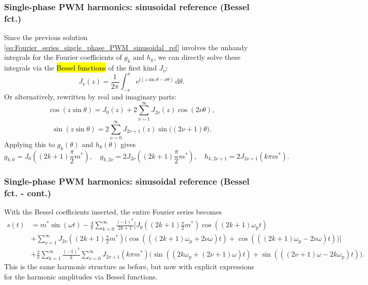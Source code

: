 \begin{frame}
    \frametitle{Single-phase PWM harmonics: sinusoidal reference (Bessel fct.)}
    Since the previous solution \eqref{eq:Fourier_series_single_phase_PWM_sinusoidal_ref} involves the unhandy integrals for the Fourier coefficients of $g_k$ and $h_k$, we can directly solve these integrals via the \hl{Bessel functions} of the first kind $J_\nu$:
    \begin{equation}
        J_\nu(z)=\frac{1}{2\pi}\int_{-\pi}^{\pi}e^{\mathrm{j}(z\sin\theta-\nu\theta)}\,\mathrm{d}\theta.
    \end{equation}
    Or alternatively, rewritten by real and imaginary parts:
    \[
        \cos(z\sin\theta)=J_0(z)+2\sum_{\nu=1}^{\infty}J_{2\nu}(z)\cos(2\nu\theta),
    \]
    \[
        \sin(z\sin\theta)=2\sum_{\nu=0}^{\infty}J_{2\nu+1}(z)\sin\bigl((2\nu+1)\theta\bigr).
    \]
    Applying this to $g_k(\theta)$ and $h_k(\theta)$ gives
    \begin{equation*}
        g_{k,0}=J_0\!\left((2k+1)\frac{\pi}{2}m^*\right),
        \quad
        g_{k,2\nu}=2J_{2\nu}\!\left((2k+1)\frac{\pi}{2}m^*\right), \quad h_{k,2\nu+1}=2J_{2\nu+1}(k\pi m^*).
    \end{equation*}
\end{frame}

\begin{frame}
    \frametitle{Single-phase PWM harmonics: sinusoidal reference (Bessel fct. - cont.)}
    With the Bessel coefficients inserted, the entire Fourier series becomes
    \begin{equation*}
        \begin{aligned}
            s(t) & =  m^*\sin(\omega t)
            -\frac{4}{\pi}\sum_{k=0}^{\infty}\frac{(-1)^k}{2k+1}
            \Biggl[J_0\!\left((2k+1)\frac{\pi}{2}m^*\right)
                \cos\!\left((2k+1)\omega_\mathrm{p}t\right)                                        \\
                &
                +\sum_{\nu=1}^{\infty}J_{2\nu}\!\left((2k+1)\frac{\pi}{2}m^*\right)
                \Biggl(\cos\!\left(\left((2k+1)\omega_\mathrm{p}+2\nu\omega\right)t\right)
                +\cos\!\left(\left((2k+1)\omega_\mathrm{p}-2\nu\omega\right)t\right)\Biggr)\Biggr] \\
                 & +\frac{2}{\pi}\sum_{k=1}^{\infty}\frac{(-1)^k}{k}
            \sum_{\nu=0}^{\infty}J_{2\nu+1}(k\pi m^*)
            \Biggl(\sin\!\left(\left(2k\omega_\mathrm{p}+(2\nu+1)\omega\right)t\right)
            +\sin\!\left(\left((2\nu+1)\omega-2k\omega_\mathrm{p}\right)t\right)\Biggr).
        \end{aligned}
    \end{equation*}
    This is the same harmonic structure as before, but now with explicit expressions for the harmonic amplitudes via Bessel functions.
\end{frame}

